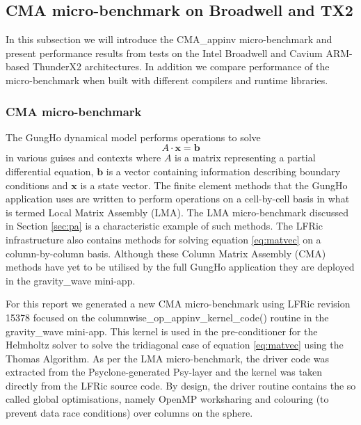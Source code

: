 \subsection{CMA micro-benchmark on Broadwell and TX2}
\label{sec:pa-microbenchmark}
In this subsection we will introduce the CMA\_appinv micro-benchmark and present performance results from tests on the Intel Broadwell and Cavium ARM-based ThunderX2 architectures.
In addition we compare performance of the micro-benchmark when built with different compilers and runtime libraries.


\subsubsection{CMA micro-benchmark}

The GungHo dynamical model performs operations to solve
\begin{equation} \label{eq:matvec}
A \cdot \mathbf{x} = \mathbf{b}
\end{equation}
in various guises and contexts where $A$ is a matrix representing a partial differential equation, $\mathbf{b}$ is a vector containing information describing boundary conditions and $\mathbf{x}$ is a state vector.
The finite element methods that the GungHo application uses are written to perform operations on a cell-by-cell basis in what is termed Local Matrix Assembly (LMA).
The LMA micro-benchmark discussed in Section \ref{sec:pa} is a characteristic example of such methods.
The LFRic infrastructure also contains methods for solving equation \ref{eq:matvec} on a column-by-column basis.
Although these Column Matrix Assembly (CMA) methods have yet to be utilised by the full GungHo application they are deployed in the gravity\_wave mini-app.

For this report we generated a new CMA micro-benchmark using LFRic revision 15378 focused on the columnwise\_op\_appinv\_kernel\_code() routine in the gravity\_wave mini-app.
This kernel is used in the pre-conditioner for the Helmholtz solver to solve the tridiagonal case of equation \ref{eq:matvec} using the Thomas Algorithm.
As per the LMA micro-benchmark, the driver code was extracted from the Psyclone-generated Psy-layer and the kernel was taken directly from the LFRic source code.
By design, the driver routine contains the so called global optimisations, namely OpenMP worksharing and colouring (to prevent data race conditions) over columns on the sphere.

